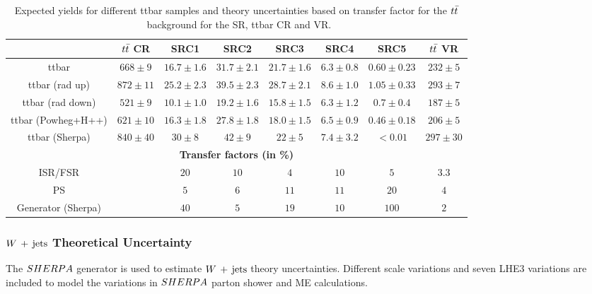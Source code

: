    \begin{table}[!h]
    \begin{center} \footnotesize
      \begin{tabular}{|c|c|c|c|c|c|c|c|}
        \hline
        & $t\bar{t}$ CR & SRC1 & SRC2 & SRC3 & SRC4 & SRC5 & $t\bar{t}$ VR\\
        \hline
ttbar&   $668\pm 9 $&    $16.7\pm 1.6 $&         $31.7\pm 2.1 $&         $21.7\pm 1.6 $&         $6.3\pm 0.8 $&          $0.60\pm 0.23 $&         $232\pm 5 $\\
ttbar (rad up)&          $872\pm 11 $&   $25.2\pm 2.3 $&         $39.5\pm 2.3 $&         $28.7\pm 2.1 $&         $8.6\pm 1.0 $&  $1.05\pm 0.33 $&         $293\pm 7 $\\
ttbar (rad down)&        $521\pm 9 $&    $10.1\pm 1.0 $&         $19.2\pm 1.6 $&         $15.8\pm 1.5 $&         $6.3\pm 1.2 $&  $0.7\pm 0.4 $&   $187\pm 5 $\\
ttbar (Powheg+H++)&      $621\pm 10 $&   $16.3\pm 1.8 $&         $27.8\pm 1.8 $&         $18.0\pm 1.5 $&         $6.5\pm 0.9 $&  $0.46\pm 0.18 $&         $206\pm 5 $\\
ttbar (Sherpa)&          $840\pm 40 $&   $30\pm 8 $&     $42\pm 9 $&     $22\pm 5 $&     $7.4\pm 3.2 $&          $<0.01$&        $297\pm 30 $\\        
        \hline
        \multicolumn{8}{c}{\bf Transfer factors (in \%)} \\ \hline
        ISR/FSR &  &      $20$&   $10$&   $4$&    $10$&   $5$&    $3.3$\\
        PS &     &   $5$&    $6$&    $11$&   $11$&   $20$&   $4$\\
        Generator (Sherpa) &    &    $40$&   $5$&    $19$&   $10$&   $100$&          $2$\\
        \hline       
        \end{tabular}
    \end{center}
    \caption{Expected yields for different ttbar samples and theory uncertainties based on transfer factor for the $t\bar{t}$\ background for the SR, ttbar CR and VR.}
    \label{tab:ttbar_unc_SRC}
  \end{table}

\subsubsection*{$W\,+\,\mathrm{jets}$ Theoretical Uncertainty}

\indent The $SHERPA$ generator is used to estimate $W\,+\,\mathrm{jets}$ theory uncertainties.  Different scale variations and seven LHE3 variations are included to model the variations in $SHERPA$ parton shower and ME calculations.  \\


